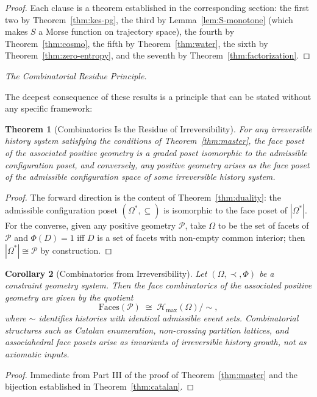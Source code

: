 \documentclass[11pt]{article}
\theoremstyle{plain}
\newtheorem{theorem}{Theorem}[section]
\newtheorem{corollary}[theorem]{Corollary}
\theoremstyle{definition}
\theoremstyle{remark}
\newcommand{\Phif}{\Phi}
\newcommand{\Sf}{S}
\newcommand{\OmKS}{\Omega}
\newcommand{\Hmax}{\mathcal{H}_{\max}}
\begin{document}
\begin{proof}
Each clause is a theorem established in the corresponding section: the first two by Theorem~\ref{thm:kes-pg}, the third by Lemma~\ref{lem:S-monotone} (which makes $\Sf$ a Morse function on trajectory space), the fourth by Theorem~\ref{thm:cosmo}, the fifth by Theorem~\ref{thm:water}, the sixth by Theorem~\ref{thm:zero-entropy}, and the seventh by Theorem~\ref{thm:factorization}.
\end{proof}

\medskip\noindent\textit{The Combinatorial Residue Principle.}

The deepest consequence of these results is a principle that can be stated without any specific framework:

\begin{theorem}[Combinatorics Is the Residue of Irreversibility]
For any irreversible history system satisfying the conditions of Theorem~\ref{thm:master}, the face poset of the associated positive geometry is a graded poset isomorphic to the admissible configuration poset, and conversely, any positive geometry arises as the face poset of the admissible configuration space of some irreversible history system.
\end{theorem}

\begin{proof}
The forward direction is the content of Theorem~\ref{thm:duality}: the admissible configuration poset $(\OmKS^*, \subseteq)$ is isomorphic to the face poset of $|\OmKS^*|$. For the converse, given any positive geometry $\mathcal{P}$, take $\OmKS$ to be the set of facets of $\mathcal{P}$ and $\Phif(D) = 1$ iff $D$ is a set of facets with non-empty common interior; then $|\OmKS^*| \cong \mathcal{P}$ by construction.
\end{proof}

\begin{corollary}[Combinatorics from Irreversibility]
\label{cor:irreversibility}
Let $(\OmKS, \prec, \Phif)$ be a constraint geometry system. Then the face combinatorics of the associated positive geometry are given by the quotient
\[
  \mathrm{Faces}(\mathcal{P}) \;\cong\; \Hmax(\OmKS)/\!\sim,
\]
where $\sim$ identifies histories with identical admissible event sets. Combinatorial structures such as Catalan enumeration, non-crossing partition lattices, and associahedral face posets arise as invariants of irreversible history growth, not as axiomatic inputs.
\end{corollary}

\begin{proof}
Immediate from Part III of the proof of Theorem~\ref{thm:master} and the bijection established in Theorem~\ref{thm:catalan}.
\end{proof}
\end{document}

